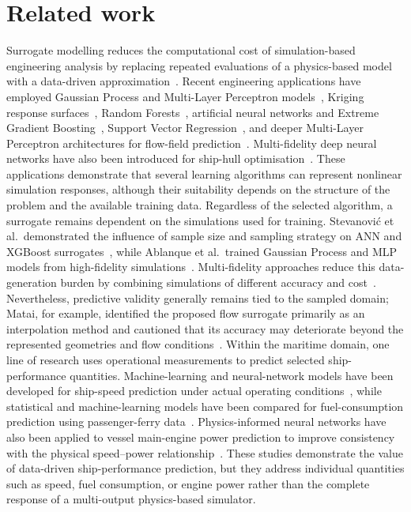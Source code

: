 \documentclass[final,5p,times,twocolumn,numbers]{elsarticle}
\begin{document}
\section{Related work}\label{sec:related}
Surrogate modelling reduces the computational cost of simulation-based engineering analysis by replacing repeated evaluations of a physics-based model with a data-driven approximation~\cite{koziel2013}. Recent engineering applications have employed Gaussian Process and Multi-Layer Perceptron models~\cite{ablanque2025}, Kriging response surfaces~\cite{baum2025}, Random Forests~\cite{jiao2025rf}, artificial neural networks and Extreme Gradient Boosting~\cite{stevanovic2024}, Support Vector Regression~\cite{li2024svr}, and deeper Multi-Layer Perceptron architectures for flow-field prediction~\cite{matai2025}. Multi-fidelity deep neural networks have also been introduced for ship-hull optimisation~\cite{wei2025mfdnn}. These applications demonstrate that several learning algorithms can represent nonlinear simulation responses, although their suitability depends on the structure of the problem and the available training data.
Regardless of the selected algorithm, a surrogate remains dependent on the simulations used for training. Stevanovi\'{c} et al.\ demonstrated the influence of sample size and sampling strategy on ANN and XGBoost surrogates~\cite{stevanovic2024}, while Ablanque et al.\ trained Gaussian Process and MLP models from high-fidelity simulations~\cite{ablanque2025}. Multi-fidelity approaches reduce this data-generation burden by combining simulations of different accuracy and cost~\cite{wei2025mfdnn}. Nevertheless, predictive validity generally remains tied to the sampled domain; Matai, for example, identified the proposed flow surrogate primarily as an interpolation method and cautioned that its accuracy may deteriorate beyond the represented geometries and flow conditions~\cite{matai2025}.
Within the maritime domain, one line of research uses operational measurements to predict selected ship-performance quantities. Machine-learning and neural-network models have been developed for ship-speed prediction under actual operating conditions~\cite{bassam2022,bassam2023}, while statistical and machine-learning models have been compared for fuel-consumption prediction using passenger-ferry data~\cite{agand2023}. Physics-informed neural networks have also been applied to vessel main-engine power prediction to improve consistency with the physical speed--power relationship~\cite{bourchas2025}. These studies demonstrate the value of data-driven ship-performance prediction, but they address individual quantities such as speed, fuel consumption, or engine power rather than the complete response of a multi-output physics-based simulator.
\end{document}
